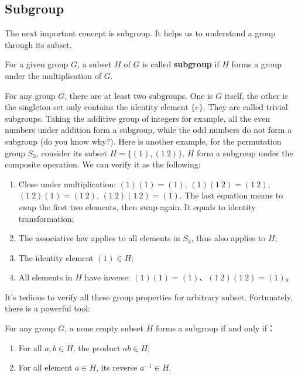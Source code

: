 \documentclass[b5paper]{article}
\begin{document}
\subsection{Subgroup}

The next important concept is subgroup. It helps us to understand a group through its subset.

\begin{definition}
For a given group $G$, a subset $H$ of $G$ is called \textbf{subgroup} if $H$ forms a group under the multiplication of $G$.
\end{definition}

For any group $G$, there are at least two subgroups. One is $G$ itself, the other is the singleton set only contains the identity element $\{e\}$. They are called trivial subgroups. Taking the additive group of integers for example, all the even numbers under addition form a subgroup, while the odd numbers do not form a subgroup (do you know why?). Here is another example, for the permutation group $S_3$, consider its subset $H = \{(1), (1\ 2)\}$. $H$ form a subgroup under the composite operation. We can verify it as the following:

\begin{enumerate}
\item Close under multiplication: $(1)(1) = (1)$, $(1)(1\ 2) = (1\ 2)$, $(1\ 2)(1) = (1\ 2)$, $(1\ 2) (1\ 2) = (1)$. The last equation means to swap the first two elements, then swap again. It equals to identity transformation;
\item The associative law applies to all elements in $S_3$, thus also applies to $H$;
\item The identity element $(1) \in H$;
\item All elements in $H$ have inverse: $(1)(1) = (1)$、$(1\ 2) (1\ 2) = (1)$。
\end{enumerate}

It's tedious to verify all these group properties for arbitrary subset. Fortunately, there is a powerful tool:

\begin{theorem}
For any group $G$, a none empty subset $H$ forms a subgroup if and only if：
\begin{enumerate}
\item For all $a, b \in H$, the product $ab \in H$;
\item For all element $a \in H$, its reverse $a^{-1} \in H$.
\end{enumerate}
\label{theorem:subgroup}
\end{theorem}
\end{document}
